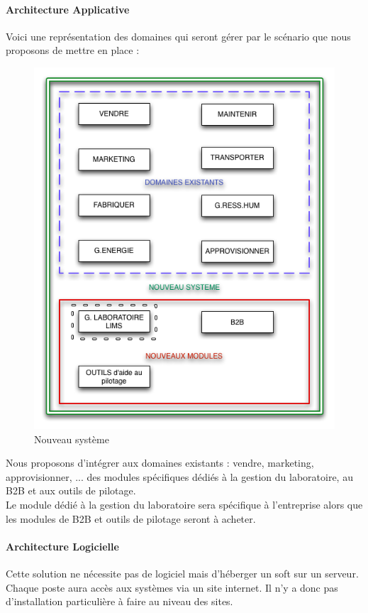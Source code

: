\paragraph{Architecture Applicative}
Voici une représentation des domaines qui seront gérer par le scénario que nous proposons de mettre en place :
\begin{figure}[H]
\begin{center}
 \includegraphics[scale=0.5]{ERPsolution.png}
  \caption{Nouveau système}
\end{center}  
\end{figure}

Nous proposons d'intégrer aux domaines existants : vendre, marketing, approvisionner, ...  des modules spécifiques dédiés à la gestion du laboratoire, au B2B et aux outils de pilotage. \\
Le module dédié à la gestion du laboratoire sera spécifique à l'entreprise alors que les modules de B2B et outils de pilotage seront à acheter. 

\paragraph{Architecture Logicielle}
Cette solution ne nécessite pas de logiciel mais d'héberger un soft sur un serveur. Chaque poste aura accès aux systèmes via un site internet. Il n'y a donc pas d'installation particulière à faire au niveau des sites.
